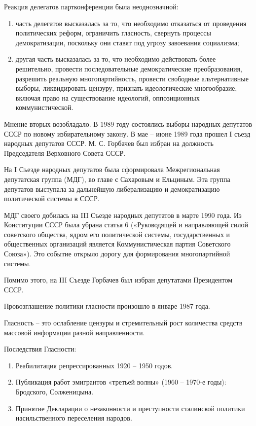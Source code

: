 \documentclass{article}
\begin{document}
Реакция делегатов партконференции была неоднозначной:

\begin{enumerate}
    \item часть делегатов высказалась за то, что необходимо отказаться от проведения политических реформ, ограничить гласность, свернуть процессы демократизации, поскольку они ставят под угрозу завоевания социализма;
    \item другая часть высказалась за то, что необходимо действовать более решительно, провести последовательные демократические преобразования, разрешить реальную многопартийность, провести свободные альтернативные выборы, ликвидировать цензуру, признать идеологические многообразие, включая право на существование идеологий, оппозиционных коммунистической.
\end{enumerate}

Мнение вторых возобладало. В 1989 году состоялись выборы народных депутатов СССР по новому избирательному закону.
В мае – июне 1989 года прошел I съезд народных депутатов СССР. М. С. Горбачев был избран на должность Председателя Верховного Совета СССР.

\hfill

На I Съезде народных депутатов была сформировала Межрегиональная депутатская группа (МДГ), во главе с Сахаровым и Ельциным. Эта группа депутатов выступала за дальнейшую либерализацию и демократизацию политической системы в СССР.

\hfill

МДГ своего добилась на III Съезде народных депутатов в марте 1990 года. Из Конституции СССР была убрана статья 6 («Руководящей и направляющей силой советского общества, ядром его политической системы, государственных и общественных организаций является Коммунистическая партия Советского Союза»). Это событие открыло дорогу для формирования многопартийной системы.

\hfill

Помимо этого, на III Съезде Горбачев был избран депутатами Президентом СССР.

\hfill

Провозглашение политики гласности произошло в январе 1987 года.

Гласность – это ослабление цензуры и стремительный рост количества средств массовой информации разной направленности.

Последствия Гласности:

\begin{enumerate}
    \item Реабилитация репрессированных 1920 – 1950 годов.
    \item Публикация работ эмигрантов «третьей волны» (1960 – 1970-е годы): Бродского, Солженицына.
    \item Принятие Декларации о незаконности и преступности сталинской политики насильственного переселения народов.
\end{enumerate}
\end{document}
